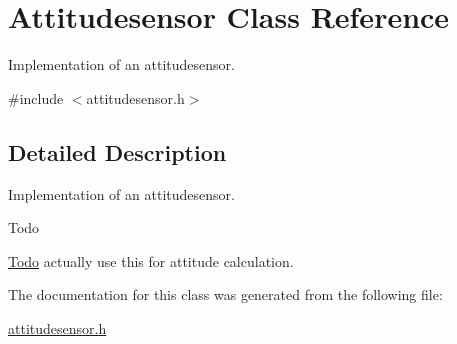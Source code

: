 \hypertarget{classAttitudesensor}{}\section{Attitudesensor Class Reference}
\label{classAttitudesensor}


Implementation of an attitudesensor.  




{\ttfamily \#include $<$attitudesensor.\+h$>$}



\subsection{Detailed Description}
Implementation of an attitudesensor. 

\begin{DoxyRefDesc}{Todo}
\item[\hyperlink{todo__todo000002}{Todo}]actually use this for attitude calculation. \end{DoxyRefDesc}


The documentation for this class was generated from the following file\+:\begin{DoxyCompactItemize}
\item 
\hyperlink{attitudesensor_8h}{attitudesensor.\+h}\end{DoxyCompactItemize}

